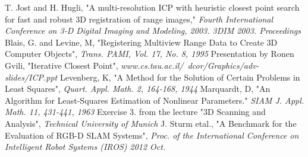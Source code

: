 \documentclass[a4paper,pagesize 10pt]{scrartcl}
\begin{document}


\begin{thebibliography}{5}
    T. Jost and H. Hugli, "A multi-resolution ICP with heuristic closest point search for fast and robust 3D registration of range images," \textit{Fourth International Conference on 3-D Digital Imaging and Modeling, 2003. 3DIM 2003. Proceedings}
    Blais, G. and Levine, M, "Registering Multiview Range Data to Create 3D Computer Objects", \textit{Trans. PAMI, Vol. 17, No. 8, 1995}
    Presentation by Ronen Gvili, "Iterative Closest Point", \textit{www.cs.tau.ac.il/~dcor/Graphics/adv-slides/ICP.ppt}
    Levenberg, K, "A Method for the Solution of Certain Problems in Least Squares", \textit{Quart. Appl. Math. 2, 164-168, 1944}
    Marquardt, D, "An Algorithm for Least-Squares Estimation of Nonlinear Parameters." \textit{SIAM J. Appl. Math. 11, 431-441, 1963}
    Exercise 3. from the lecture "3D Scanning and Analysis", \textit{Technical University of Munich}
    J. Sturm etal., "A Benchmark for the Evaluation of RGB-D SLAM Systems", \textit{Proc. of the International Conference on Intelligent Robot Systems (IROS) 2012 Oct.}
\end{thebibliography}
\end{document}

